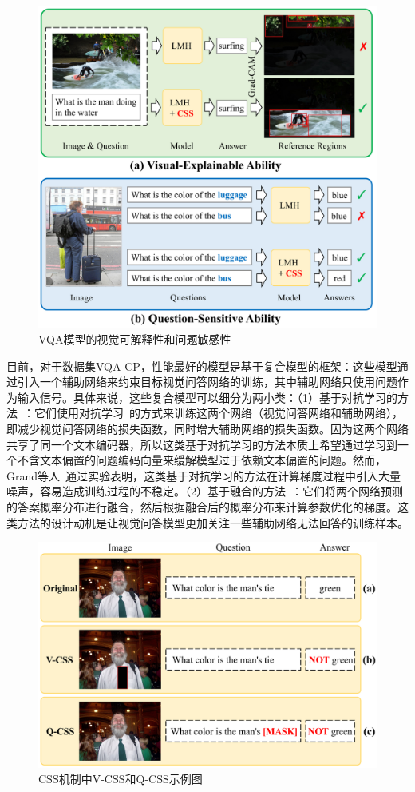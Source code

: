 \begin{figure}[t]
    \centering
        \includegraphics[width=0.85\linewidth]{chapter7/res/motivation.pdf}
    \caption{VQA模型的视觉可解释性和问题敏感性}
    \label{ch7:fig:motivation}
\end{figure}

目前，对于数据集VQA-CP，性能最好的模型是基于复合模型的框架：这些模型通过引入一个辅助网络来约束目标视觉问答网络的训练，其中辅助网络只使用问题作为输入信号。具体来说，这些复合模型可以细分为两小类：（1）基于对抗学习的方法~\cite{ramakrishnan2018overcoming,grand2019adversarial,belinkov2019don}：它们使用对抗学习~\cite{goodfellow2014generative}的方式来训练这两个网络（视觉问答网络和辅助网络），即减少视觉问答网络的损失函数，同时增大辅助网络的损失函数。因为这两个网络共享了同一个文本编码器，所以这类基于对抗学习的方法本质上希望通过学习到一个不含文本偏置的问题编码向量来缓解模型过于依赖文本偏置的问题。然而，Grand等人~\cite{grand2019adversarial}通过实验表明，这类基于对抗学习的方法在计算梯度过程中引入大量噪声，容易造成训练过程的不稳定。（2）基于融合的方法~\cite{cadene2019rubi,clark2019don,mahabadi2019simple}：它们将两个网络预测的答案概率分布进行融合，然后根据融合后的概率分布来计算参数优化的梯度。这类方法的设计动机是让视觉问答模型更加关注一些辅助网络无法回答的训练样本。

\begin{figure}[t]
    \centering
        \includegraphics[width=0.85\linewidth]{chapter7/res/V-CSS_Q-CSS.pdf}
    \caption{CSS机制中V-CSS和Q-CSS示例图}
    \label{ch7:fig:V-CSS_Q-CSS}
\end{figure}

